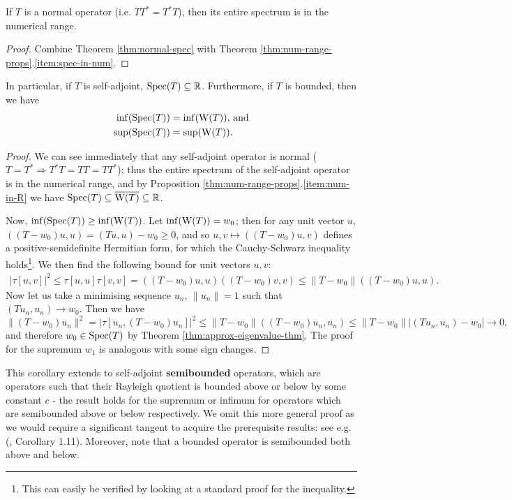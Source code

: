 \documentclass[../main.tex]{subfiles}
\begin{document}
\begin{corollary}\label{thm:normal-spec-in-num}
  If $T$ is a normal operator (i.e. $TT^* = T^*T$),
  then its entire spectrum is in the numerical range.
\end{corollary}
\begin{proof}
Combine Theorem \ref{thm:normal-spec} with Theorem \ref{thm:num-range-props}.\ref{item:spec-in-num}.
\end{proof}

\begin{theorem}\label{thm:self-adj-num-range}
  In particular, if $T$ is self-adjoint, $\mathrm{Spec}(T) \subseteq \mathbb{R}$.
  Furthermore, if $T$ is bounded, then we have 
  \begin{align*}
    \inf(\mathrm{Spec}(T)) & = \inf(\mathrm{W}(T))\text{, and}\\
    \sup(\mathrm{Spec}(T)) & = \sup(\mathrm{W}(T)).
  \end{align*}
\end{theorem}
\begin{proof}
We can see immediately that any self-adjoint operator is normal ($T = T^*
\Rightarrow T^*T = TT = TT^*$); thus the entire spectrum of the
self-adjoint operator is in the numerical range, and by Proposition
\ref{thm:num-range-props}.\ref{item:num-in-R} we have $\mathrm{Spec}(T)
\subseteq \overline{\mathrm{W}(T)} \subseteq \mathbb{R}$.

Now, $\inf(\mathrm{Spec}(T)) \geq \inf(\mathrm{W}(T))$. Let $\inf(\mathrm{W}(T)) = w_0$; then for
any unit vector $u$, $((T - w_0)u, u)  = (Tu, u) - w_0 \geq 0$, and so
$u, v \mapsto ((T - w_0)u, v)$ defines a positive-semidefinite Hermitian
form, for which the Cauchy-Schwarz inequality holds\footnote{This can
easily be verified by looking at a standard proof for the inequality.}.
We then find the following bound for unit vectors $u, v$:
\begin{align*}
|\tau[u,v]|^2 \leq \tau[u, u] \tau[v, v] = ((T - w_0)u, u)((T - w_0)v, v) 
					 \leq \|T - w_0\|((T - w_0)u, u).
\end{align*}
Now let us take a minimising sequence $u_n$, $\|u_n\| = 1$ such that 
$(Tu_n, u_n) \rightarrow w_0$.
Then we have
\begin{equation*}
\|(T - w_0)u_n\|^2 = |\tau[u_n, (T - w_0)u_n]|^2  
		   \leq \|T - w_0\|((T - w_0)u_n, u_n) 
		   \leq \|T - w_0\||(Tu_n, u_n) - w_0| 
		   \rightarrow 0,
\end{equation*}
and therefore $w_0 \in \mathrm{Spec}(T)$ by Theorem \ref{thm:approx-eigenvalue-thm}.
The proof for the supremum $w_1$ is analogous with some sign changes.
\end{proof}
This corollary extends to self-adjoint
\textbf{semibounded} operators, which are operators
such that their Rayleigh quotient is bounded above or below by some constant $c$
- the result holds for the supremum or infimum for operators which are
semibounded above or below respectively. We omit this more general proof as we
would require a significant tangent to acquire the prerequisite results: see
e.g. (\cite{frank2022schrodinger}, Corollary 1.11). Moreover, note that a
bounded operator is semibounded both above and below.
\end{document}
